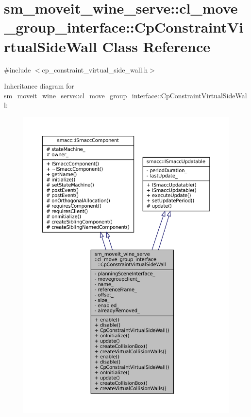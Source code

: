 \hypertarget{classsm__moveit__wine__serve_1_1cl__move__group__interface_1_1CpConstraintVirtualSideWall}{}\section{sm\+\_\+moveit\+\_\+wine\+\_\+serve\+:\+:cl\+\_\+move\+\_\+group\+\_\+interface\+:\+:Cp\+Constraint\+Virtual\+Side\+Wall Class Reference}
\label{classsm__moveit__wine__serve_1_1cl__move__group__interface_1_1CpConstraintVirtualSideWall}


{\ttfamily \#include $<$cp\+\_\+constraint\+\_\+virtual\+\_\+side\+\_\+wall.\+h$>$}



Inheritance diagram for sm\+\_\+moveit\+\_\+wine\+\_\+serve\+:\+:cl\+\_\+move\+\_\+group\+\_\+interface\+:\+:Cp\+Constraint\+Virtual\+Side\+Wall\+:
\nopagebreak
\begin{figure}[H]
\begin{center}
\leavevmode
\includegraphics[width=350pt]{classsm__moveit__wine__serve_1_1cl__move__group__interface_1_1CpConstraintVirtualSideWall__inherit__graph}
\end{center}
\end{figure}


